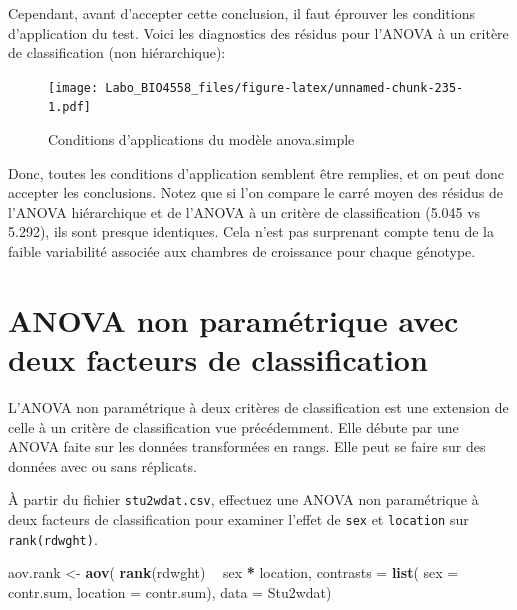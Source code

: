 \documentclass[12pt,]{book}
\newenvironment{Shaded}{\begin{snugshade}}{\end{snugshade}}
\newcommand{\DataTypeTok}[1]{\textcolor[rgb]{0.13,0.29,0.53}{#1}}
\newcommand{\KeywordTok}[1]{\textcolor[rgb]{0.13,0.29,0.53}{\textbf{#1}}}
\newcommand{\NormalTok}[1]{#1}
\newcommand{\OperatorTok}[1]{\textcolor[rgb]{0.81,0.36,0.00}{\textbf{#1}}}
\newcommand{\StringTok}[1]{\textcolor[rgb]{0.31,0.60,0.02}{#1}}
\begin{document}
Cependant, avant d'accepter cette conclusion, il faut éprouver les conditions d'application du test. Voici les diagnostics des résidus pour l'ANOVA à un critère de classification (non hiérarchique):

\begin{figure}
\centering
\texttt{[image: Labo\_BIO4558\_files/figure-latex/unnamed-chunk-235-1.pdf]}
\caption{\label{fig:unnamed-chunk-235}Conditions d'applications du modèle anova.simple}
\end{figure}

Donc, toutes les conditions d'application semblent être remplies, et on peut donc accepter les conclusions. Notez que si l'on compare le carré moyen des résidus de l'ANOVA hiérarchique et de l'ANOVA à un critère de classification (5.045 vs 5.292), ils sont presque identiques. Cela n'est pas surprenant compte tenu de la faible variabilité associée aux chambres de croissance pour chaque génotype.

\hypertarget{anova-non-paramuxe9trique-avec-deux-facteurs-de-classification}{%
\section{ANOVA non paramétrique avec deux facteurs de classification}\label{anova-non-paramuxe9trique-avec-deux-facteurs-de-classification}}

L'ANOVA non paramétrique à deux critères de classification est une extension de celle à un critère de classification vue précédemment. Elle débute par une ANOVA faite sur les données transformées en rangs. Elle peut se faire sur des données avec ou sans réplicats.

À partir du fichier \texttt{stu2wdat.csv}, effectuez une ANOVA non paramétrique à deux facteurs de classification pour examiner l'effet de \texttt{sex} et \texttt{location} sur \texttt{rank(rdwght)}.

\begin{Shaded}
\begin{Highlighting}[]
\NormalTok{aov.rank <-}\StringTok{ }\KeywordTok{aov}\NormalTok{(}
  \KeywordTok{rank}\NormalTok{(rdwght) }\OperatorTok{~}\StringTok{ }\NormalTok{sex }\OperatorTok{*}\StringTok{ }\NormalTok{location,}
  \DataTypeTok{contrasts =} \KeywordTok{list}\NormalTok{(}
    \DataTypeTok{sex =}\NormalTok{ contr.sum, }\DataTypeTok{location =}\NormalTok{ contr.sum),}
  \DataTypeTok{data =}\NormalTok{ Stu2wdat)}
\end{Highlighting}
\end{Shaded}
\end{document}
